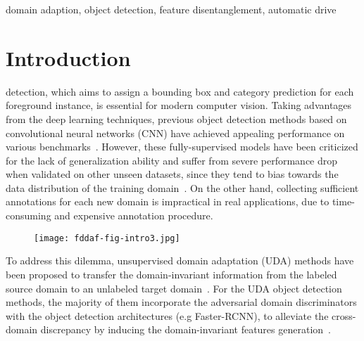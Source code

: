 \documentclass[journal]{IEEEtran}
\begin{document}
\begin{IEEEkeywords}
domain adaption, object detection, feature disentanglement, automatic drive
\end{IEEEkeywords}






\IEEEpeerreviewmaketitle

\section{Introduction}

 detection, which aims to assign a bounding box and category prediction for each foreground instance, is essential for modern computer vision. Taking advantages from the deep learning techniques, previous object detection methods based on convolutional neural networks (CNN) have achieved appealing performance on various benchmarks~\cite{girshick2015fast,ren2015faster,redmon2016you,lin2017focal,cai2018cascade}. However, these fully-supervised models have been criticized for the lack of generalization ability and suffer from severe performance drop when validated on other unseen datasets, since they tend to bias towards the data distribution of the training domain~\cite{torralba2011unbiased,yosinski2014transferable}. On the other hand, collecting sufficient annotations for each new domain is impractical in real applications, due to time-consuming and expensive annotation procedure.

\begin{figure}[htbp]
\centering
\texttt{[image: fddaf-fig-intro3.jpg]}

\caption{{} }
\label{fig-disent-c2f-intro}
\end{figure}


To address this dilemma, unsupervised domain adaptation (UDA) methods have been proposed to transfer the domain-invariant information from the labeled source domain to an unlabeled target domain~\cite{pan2009survey,ganin2014unsupervised,tzeng2017adversarial}. For the UDA object detection methods, the majority of them incorporate the adversarial domain discriminators with the object detection architectures (e.g Faster-RCNN), to alleviate the cross-domain discrepancy by inducing the domain-invariant features generation~\cite{chen2018domain,he2019multi,saito2019strong,he2020domain}.
\end{document}

